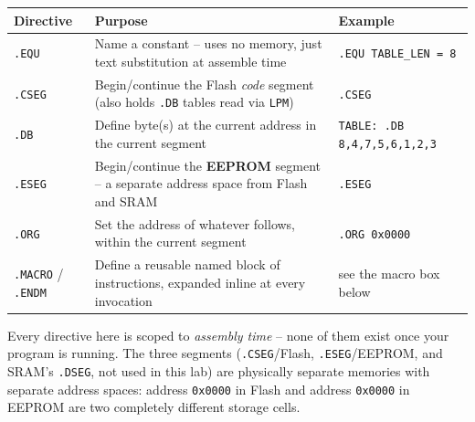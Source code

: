 \documentclass[11pt]{article}
\begin{document}
\begin{summary}
\begin{center}
\begin{tabular}{@{}p{2.3cm}p{6.0cm}p{5.6cm}@{}}
\toprule
\textbf{Directive} & \textbf{Purpose} & \textbf{Example} \\
\midrule
\texttt{.EQU} & Name a constant -- uses no memory, just text substitution at
assemble time & \texttt{.EQU TABLE\_LEN = 8} \\
\texttt{.CSEG} & Begin/continue the Flash \emph{code} segment (also holds
\texttt{.DB} tables read via \texttt{LPM}) & \texttt{.CSEG} \\
\texttt{.DB} & Define byte(s) at the current address in the current segment &
\texttt{TABLE: .DB 8,4,7,5,6,1,2,3} \\
\texttt{.ESEG} & Begin/continue the \textbf{EEPROM} segment -- a separate address
space from Flash and SRAM & \texttt{.ESEG} \\
\texttt{.ORG} & Set the address of whatever follows, within the current segment &
\texttt{.ORG 0x0000} \\
\texttt{.MACRO} / \texttt{.ENDM} & Define a reusable named block of instructions,
expanded inline at every invocation & see the macro box below \\
\bottomrule
\end{tabular}
\end{center}
Every directive here is scoped to \emph{assembly time} -- none of them exist once
your program is running. The three segments (\texttt{.CSEG}/Flash,
\texttt{.ESEG}/EEPROM, and SRAM's \texttt{.DSEG}, not used in this lab) are
physically separate memories with separate address spaces: address \texttt{0x0000}
in Flash and address \texttt{0x0000} in EEPROM are two completely different
storage cells.
\end{summary}
\end{document}
